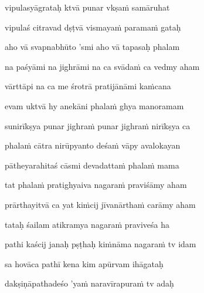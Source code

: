 vipulasyāgrataḥ ktvā punar vkṣaṁ samāruhat \veg\dontdisplaylinenum

vipulaś citravad dṣṭvā vismayaṁ paramaṁ gataḥ\thinspace{\dandab} \dontdisplaylinenum

aho vā svapnabhūto 'smi aho vā tapasaḥ phalam \veg\dontdisplaylinenum

na paśyāmi na jighrāmi na ca svādaṁ ca vedmy aham\thinspace{\dandab} \dontdisplaylinenum

vārttāpi na ca me śrotrā pratijānāmi kaṁcana \veg\dontdisplaylinenum
{}

evam uktvā hy anekāni phalaṁ ghya manoramam\thinspace{\dandab} \dontdisplaylinenum

sunirīkṣya punar jighraṁ punar jighraṁ nirīkṣya ca \veg\dontdisplaylinenum

phalaṁ cātra nirūpyanto deśaṁ vāpy avalokayan\thinspace{\dandab} \dontdisplaylinenum

pātheyarahitaś cāsmi devadattaṁ phalaṁ mama \veg\dontdisplaylinenum
{}

tat phalaṁ pratighyaiva nagaraṁ praviśāmy aham\thinspace{\dandab} \dontdisplaylinenum

prārthayitvā ca yat kiṁcij jīvanārthaṁ carāmy aham \veg\dontdisplaylinenum
{}

tataḥ śailam atikramya nagaraṁ praviveśa ha\thinspace{\dandab} \dontdisplaylinenum

pathi kaścij janaḥ pṣṭhaḥ kiṁnāma nagaraṁ tv idam \veg\dontdisplaylinenum
{}

sa hovāca pathī kena kim apūrvam ihāgataḥ\thinspace{\dandab} \dontdisplaylinenum

dakṣiṇāpathadeśo 'yaṁ naravīrapuraṁ tv adaḥ \veg\dontdisplaylinenum
{}


